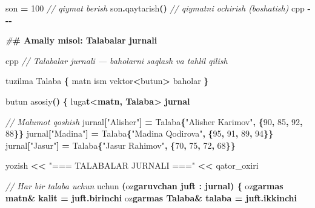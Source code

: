 \documentclass[a4paper,11pt,twoside,openright]{book}
\newenvironment{Shaded}{\begin{snugshade}}{\end{snugshade}}
\newcommand{\CharTok}[1]{\textcolor[rgb]{0.31,0.60,0.02}{#1}}
\newcommand{\CommentTok}[1]{\textcolor[rgb]{0.56,0.35,0.01}{\textit{#1}}}
\newcommand{\DecValTok}[1]{\textcolor[rgb]{0.00,0.00,0.81}{#1}}
\newcommand{\ErrorTok}[1]{\textcolor[rgb]{0.64,0.00,0.00}{\textbf{#1}}}
\newcommand{\NormalTok}[1]{#1}
\newcommand{\OperatorTok}[1]{\textcolor[rgb]{0.81,0.36,0.00}{\textbf{#1}}}
\newcommand{\PreprocessorTok}[1]{\textcolor[rgb]{0.56,0.35,0.01}{\textit{#1}}}
\newcommand{\StringTok}[1]{\textcolor[rgb]{0.31,0.60,0.02}{#1}}
\begin{document}
\begin{Shaded}
\begin{Highlighting}[]
\NormalTok{son }\OperatorTok{=} \DecValTok{100}                                      \CommentTok{// qiymat berish}
\NormalTok{son}\OperatorTok{.}\NormalTok{qaytarish}\OperatorTok{()}                                \CommentTok{// qiymatni o\textquotesingle{}chirish (bo\textquotesingle{}shatish)}
\ErrorTok{\textasciigrave{}\textasciigrave{}\textasciigrave{}}\NormalTok{cpp}
\OperatorTok{{-}{-}{-}}

\PreprocessorTok{\#}\ErrorTok{\# Amaliy misol: Talabalar jurnali}

\ErrorTok{\textasciigrave{}\textasciigrave{}\textasciigrave{}}\NormalTok{cpp}
\CommentTok{// Talabalar jurnali — baholarni saqlash va tahlil qilish}

\NormalTok{tuzilma Talaba }\OperatorTok{\{}
\NormalTok{    matn ism}
\NormalTok{    vektor}\OperatorTok{\textless{}}\NormalTok{butun}\OperatorTok{\textgreater{}}\NormalTok{ baholar}
\OperatorTok{\}}

\NormalTok{butun asosiy}\OperatorTok{()} \OperatorTok{\{}
\NormalTok{    lug}\CharTok{\textquotesingle{}a}\ErrorTok{t\textless{}matn, Talaba\textgreater{} jurnal}

    \CommentTok{// Ma\textquotesingle{}lumot qo\textquotesingle{}shish}
\NormalTok{    jurnal}\OperatorTok{[}\StringTok{"Alisher"}\OperatorTok{]} \OperatorTok{=}\NormalTok{ Talaba}\OperatorTok{\{}\StringTok{"Alisher Karimov"}\OperatorTok{,} \OperatorTok{\{}\DecValTok{90}\OperatorTok{,} \DecValTok{85}\OperatorTok{,} \DecValTok{92}\OperatorTok{,} \DecValTok{88}\OperatorTok{\}\}}
\NormalTok{    jurnal}\OperatorTok{[}\StringTok{"Madina"}\OperatorTok{]} \OperatorTok{=}\NormalTok{ Talaba}\OperatorTok{\{}\StringTok{"Madina Qodirova"}\OperatorTok{,} \OperatorTok{\{}\DecValTok{95}\OperatorTok{,} \DecValTok{91}\OperatorTok{,} \DecValTok{89}\OperatorTok{,} \DecValTok{94}\OperatorTok{\}\}}
\NormalTok{    jurnal}\OperatorTok{[}\StringTok{"Jasur"}\OperatorTok{]} \OperatorTok{=}\NormalTok{ Talaba}\OperatorTok{\{}\StringTok{"Jasur Rahimov"}\OperatorTok{,} \OperatorTok{\{}\DecValTok{70}\OperatorTok{,} \DecValTok{75}\OperatorTok{,} \DecValTok{72}\OperatorTok{,} \DecValTok{68}\OperatorTok{\}\}}

\NormalTok{    yozish }\OperatorTok{\textless{}\textless{}} \StringTok{"=== TALABALAR JURNALI ==="} \OperatorTok{\textless{}\textless{}}\NormalTok{ qator\_oxiri}

    \CommentTok{// Har bir talaba uchun}
\NormalTok{    uchun }\OperatorTok{(}\NormalTok{o}\CharTok{\textquotesingle{}z}\ErrorTok{garuvchan juft : jurnal) \{}
\NormalTok{        o}\CharTok{\textquotesingle{}z}\ErrorTok{garmas matn\& kalit = juft.birinchi}
\NormalTok{        o}\CharTok{\textquotesingle{}z}\ErrorTok{garmas Talaba\& talaba = juft.ikkinchi}


\end{Highlighting}
\end{Shaded}
\end{document}
